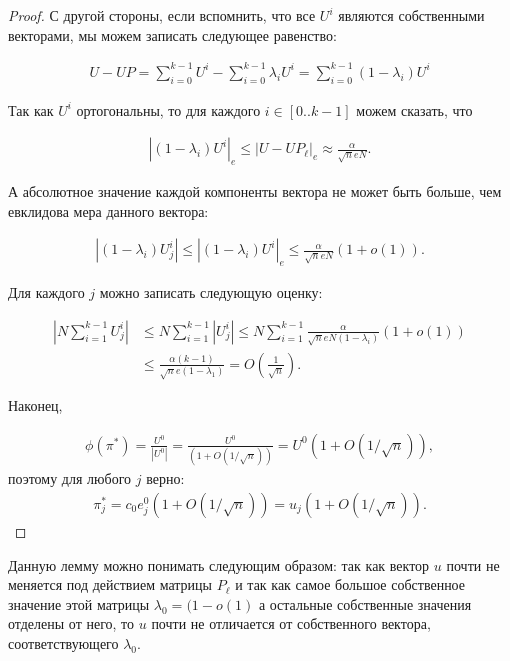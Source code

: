 \documentclass[russian]{article}
\begin{document}
\begin{proof}
С другой стороны, если вспомнить, что все $U^i$ являются собственными векторами, мы можем записать следующее равенство:

\begin{align*}
  U - UP = \sum\limits_{i = 0}^{k - 1} U^i - \sum\limits_{i = 0}^{k - 1} \lambda_i U^i = \sum\limits_{i = 0}^{k - 1} (1 - \lambda_i) U^i
\end{align*}

Так как $U^i$ ортогональны, то для каждого $i \in [0..k - 1]$ можем сказать, что

\begin{align*}
  |(1 - \lambda_i) U^i|_e \le |U - UP_\ell|_e \approx \frac{\alpha}{\sqrt{n} e N}.
\end{align*}

А абсолютное значение каждой компоненты вектора не может быть больше, чем евклидова мера данного вектора:

\begin{align*}
  |(1 - \lambda_i) U_j^i| \le |(1 - \lambda_i) U^i|_e \le \frac{\alpha}{\sqrt{n} e N} (1 + o(1)).
\end{align*}

Для каждого $j$ можно записать следующую оценку:

\begin{align*}
  |N\sum\limits_{i = 1}^{k - 1} U_j^i| &\le N\sum\limits_{i = 1}^{k - 1} |U_j^i| \le N\sum\limits_{i = 1}^{k - 1} \frac{\alpha}{\sqrt{n} e N (1 - \lambda_i)} (1 + o(1)) \\
  & \le \frac{\alpha (k - 1)}{\sqrt{n}e (1 - \lambda_1)} = O\left(\frac{1}{\sqrt{n}}\right).
\end{align*}

Наконец,

\begin{align*}
  \phi(\pi^*) = \frac{U^0}{|U^0|} = \frac{U^0}{(1 + O(1/\sqrt{n}))} = U^0 (1 + O(1/\sqrt{n})),
\end{align*}
поэтому для любого $j$ верно:
\begin{align*}
  \pi_j^* = c_0 e_j^0 (1 + O(1/\sqrt{n})) = u_j (1 + O(1/\sqrt{n})).
\end{align*}


\end{proof}

Данную лемму можно понимать следующим образом: так как вектор $u$ почти не меняется под действием матрицы $P_\ell$ и так как самое большое собственное значение этой матрицы $\lambda_0 = (1 - o(1)$ а остальные собственные значения отделены от него, то $u$ почти не отличается от собственного вектора, соответствующего $\lambda_0$.
\end{document}
